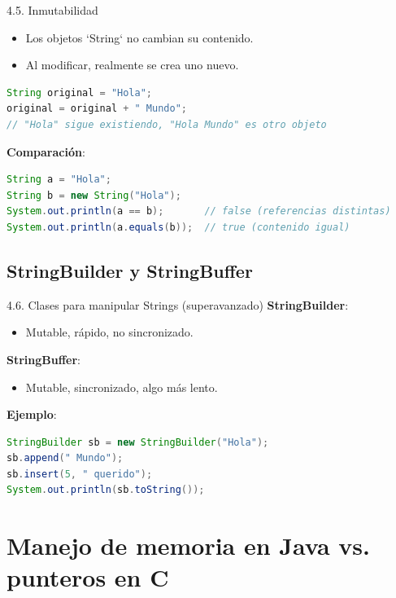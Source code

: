 \documentclass{beamer}
\begin{document}
\begin{frame}[fragile]{4.5. Inmutabilidad}
\begin{itemize}
  \item Los objetos `String` no cambian su contenido.
  \item Al modificar, realmente se crea uno nuevo.
\end{itemize}
\begin{lstlisting}[language=Java]
String original = "Hola";
original = original + " Mundo"; 
// "Hola" sigue existiendo, "Hola Mundo" es otro objeto
\end{lstlisting}

\textbf{Comparación}:
\begin{lstlisting}[language=Java]
String a = "Hola";
String b = new String("Hola");
System.out.println(a == b);       // false (referencias distintas)
System.out.println(a.equals(b));  // true (contenido igual)
\end{lstlisting}
\end{frame}

\subsection{StringBuilder y StringBuffer}

\begin{frame}[fragile]{4.6. Clases para manipular Strings (superavanzado)}
\textbf{StringBuilder}:
\begin{itemize}
  \item Mutable, rápido, no sincronizado.
\end{itemize}

\textbf{StringBuffer}:
\begin{itemize}
  \item Mutable, sincronizado, algo más lento.
\end{itemize}

\textbf{Ejemplo}:
\begin{lstlisting}[language=Java]
StringBuilder sb = new StringBuilder("Hola");
sb.append(" Mundo");
sb.insert(5, " querido");
System.out.println(sb.toString());
\end{lstlisting}
\end{frame}

\section{Manejo de memoria en Java vs. punteros en C}
\end{document}
